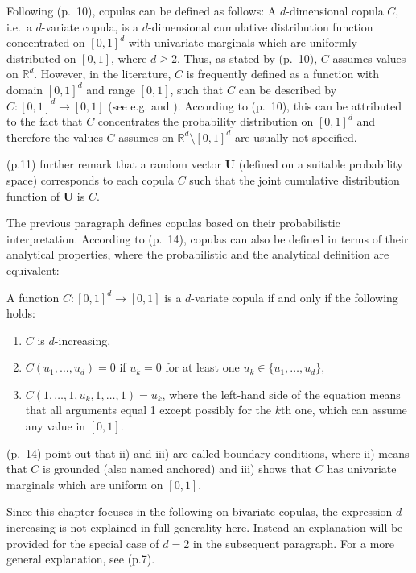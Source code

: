 \documentclass[
]{krantz}
\begin{document}
Following \citet{durante2016} (p.~10), copulas can be defined as follows: A \(d\)-dimensional copula \(C\), i.e.~a \(d\)-variate copula, is a \(d\)-dimensional cumulative distribution function concentrated on \([0,1]^d\) with univariate marginals which are uniformly distributed on \([0,1]\), where \(d \geq 2\). Thus, as stated by \citet{durante2016} (p.~10), \(C\) assumes values on \(\mathbb{R}^d\). However, in the literature, \(C\) is frequently defined as a function with domain \([0,1]^d\) and range \([0,1]\), such that \(C\) can be described by \(C: [0,1]^d \to [0,1]\) (see e.g. \citet{durante2010a} and \citet{klement2006}). According to \citet{durante2016} (p.~10), this can be attributed to the fact that \(C\) concentrates the probability distribution on \([0,1]^d\) and therefore the values \(C\) assumes on \(\mathbb{R}^d \setminus [0,1]^d\) are usually not specified.

\citet{durante2016} (p.11) further remark that a random vector \(\mathbf{U}\) (defined on a suitable probability space) corresponds to each copula \(C\) such that the joint cumulative distribution function of \(\mathbf{U}\) is \(C\).

The previous paragraph defines copulas based on their probabilistic interpretation. According to \citet{durante2016} (p.~14), copulas can also be defined in terms of their analytical properties, where the probabilistic and the analytical definition are equivalent:

A function \(C: [0,1]^d \to [0,1]\) is a \(d\)-variate copula if and only if the following holds:

\begin{enumerate}
\def\labelenumi{\roman{enumi})}
\item
  \(C\) is \(d\)-increasing,
\item
  \(C(u_1, \ldots,u_d) = 0\) if \(u_k = 0\) for at least one \(u_k \in \{u_1, \ldots, u_d\}\),
\item
  \(C(1, \ldots, 1, u_k, 1, \ldots, 1) = u_k\), where the left-hand side of the equation means that all arguments equal 1 except possibly for the \(k\)th one, which can assume any value in \([0,1]\).
\end{enumerate}

\citet{durante2016} (p.~14) point out that ii) and iii) are called boundary conditions, where ii) means that \(C\) is grounded (also named anchored) and iii) shows that \(C\) has univariate marginals which are uniform on \([0,1]\).

Since this chapter focuses in the following on bivariate copulas, the expression \(d\)-increasing is not explained in full generality here. Instead an explanation will be provided for the special case of \(d=2\) in the subsequent paragraph. For a more general explanation, see \citet{durante2016} (p.7).
\end{document}
